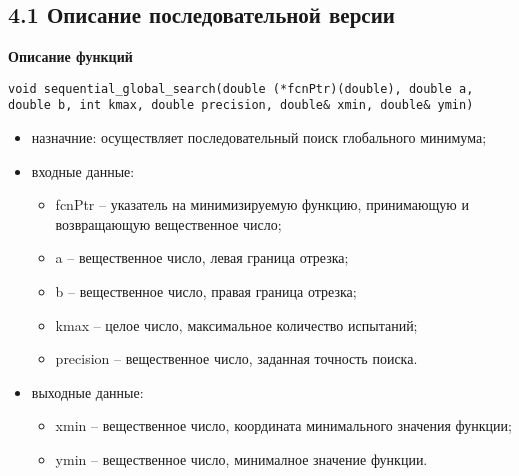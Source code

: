 \documentclass{report}
\begin{document}
\subsection*{4.1 Описание последовательной версии}
\textbf{Описание функций}
\begin{lstlisting}
void sequential_global_search(double (*fcnPtr)(double), double a, double b, int kmax, double precision, double& xmin, double& ymin)
\end{lstlisting}
\begin{itemize}
  \item назначние: осуществляет последовательный поиск глобального минимума;
  \item входные данные:
  \begin{itemize}	
    \item fcnPtr – указатель на минимизируемую функцию, принимающую и возвращающую вещественное число;
    \item a – вещественное число, левая граница отрезка;
	\item b – вещественное число, правая граница отрезка;
    \item kmax – целое число, максимальное количество испытаний;
	\item precision – вещественное число, заданная точность поиска.
  \end{itemize}
  \item выходные данные:
  \begin{itemize}
	\item xmin – вещественное число, координата минимального значения функции;
	\item ymin – вещественное число, минималное значение функции.
  \end{itemize}
\end{itemize}
\end{document}
